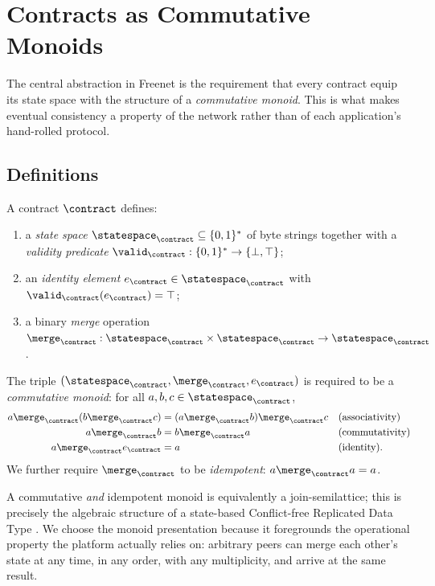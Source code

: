 \section{Contracts as Commutative Monoids}
\label{sec:monoids}

The central abstraction in Freenet is the requirement that every contract equip its state space with the structure of a \emph{commutative monoid}. This is what makes eventual consistency a property of the network rather than of each application's hand-rolled protocol.

\subsection{Definitions}

\begin{definition}
\label{def:algebra}
A contract $\contract$ defines:
\begin{enumerate}[leftmargin=*, itemsep=2pt, topsep=2pt]
  \item a \emph{state space} $\statespace_\contract \subseteq \{0,1\}^*$ of byte strings together with a \emph{validity predicate} $\valid_\contract : \{0,1\}^* \to \{\bot, \top\}$;
  \item an \emph{identity element} $e_\contract \in \statespace_\contract$ with $\valid_\contract(e_\contract) = \top$;
  \item a binary \emph{merge} operation $\merge_\contract : \statespace_\contract \times \statespace_\contract \to \statespace_\contract$.
\end{enumerate}
The triple $(\statespace_\contract, \merge_\contract, e_\contract)$ is required to be a \emph{commutative monoid}: for all $a, b, c \in \statespace_\contract$,
\begin{align*}
  a \merge_\contract (b \merge_\contract c) &= (a \merge_\contract b) \merge_\contract c &&\text{(associativity)}\\
  a \merge_\contract b &= b \merge_\contract a &&\text{(commutativity)}\\
  a \merge_\contract e_\contract &= a &&\text{(identity)}.
\end{align*}
We further require $\merge_\contract$ to be \emph{idempotent}: $a \merge_\contract a = a$.
\end{definition}

A commutative \emph{and} idempotent monoid is equivalently a join-semilattice; this is precisely the algebraic structure of a state-based Conflict-free Replicated Data Type \citep{shapiro2011crdt}. We choose the monoid presentation because it foregrounds the operational property the platform actually relies on: arbitrary peers can merge each other's state at any time, in any order, with any multiplicity, and arrive at the same result.

